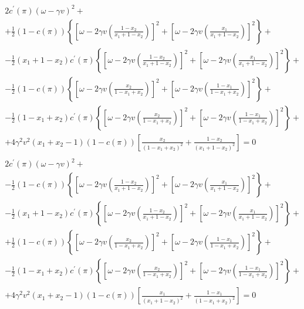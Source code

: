 \documentclass[12pt,a4paper]{article}
\begin{document}
\begin{eqnarray}
\label{focx1}
    \begin{split}
        2c^\prime(\pi)(\omega-\gamma v)^2+ \\
        +\frac{1}{2}(1-c(\pi))\left\{\left[\omega-2\gamma v\left(\frac{1-x_2}{x_1+1-x_2}\right)\right]^2+\left[\omega-2\gamma v\left(\frac{x_1}{x_1+1-x_2}\right)\right]^2\right\}+ \\
        -\frac{1}{2}(x_1 + 1-x_2)c^\prime(\pi)\left\{\left[\omega-2\gamma v\left(\frac{1-x_2}{x_1+1-x_2}\right)\right]^2+\left[\omega-2\gamma v\left(\frac{x_1}{x_1+1-x_2}\right)\right]^2\right\}+ \\
        -\frac{1}{2}(1-c(\pi))\left\{\left[\omega-2\gamma v\left(\frac{x_2}{1-x_1+x_2}\right)\right]^2+\left[\omega-2\gamma v\left(\frac{1-x_1}{1-x_1+x_2}\right)\right]^2\right\}+\\
        -\frac{1}{2}(1-x_1 + x_2)c^\prime(\pi)\left\{\left[\omega-2\gamma v\left(\frac{x_2}{1-x_1+x_2}\right)\right]^2+\left[\omega-2\gamma v\left(\frac{1-x_1}{1-x_1+x_2}\right)\right]^2\right\}+\\
        +4\gamma^2 v^2(x_1+x_2-1)(1-c(\pi))\left[\frac{x_2}{(1-x_1+x_2)^2}+\frac{1-x_2}{(x_1+1-x_2)^2}\right]=0
    \end{split} \\
    \label{focx2}
    \begin{split}
        2c^\prime(\pi)(\omega-\gamma v)^2+ \\
        -\frac{1}{2}(1-c(\pi))\left\{\left[\omega-2\gamma v\left(\frac{1-x_2}{x_1+1-x_2}\right)\right]^2+\left[\omega-2\gamma v\left(\frac{x_1}{x_1+1-x_2}\right)\right]^2\right\}+ \\
        -\frac{1}{2}(x_1 + 1-x_2)c^\prime(\pi)\left\{\left[\omega-2\gamma v\left(\frac{1-x_2}{x_1+1-x_2}\right)\right]^2+\left[\omega-2\gamma v\left(\frac{x_1}{x_1+1-x_2}\right)\right]^2\right\}+ \\
        +\frac{1}{2}(1-c(\pi))\left\{\left[\omega-2\gamma v\left(\frac{x_2}{1-x_1+x_2}\right)\right]^2+\left[\omega-2\gamma v\left(\frac{1-x_1}{1-x_1+x_2}\right)\right]^2\right\}+\\
        -\frac{1}{2}(1-x_1 + x_2)c^\prime(\pi)\left\{\left[\omega-2\gamma v\left(\frac{x_2}{1-x_1+x_2}\right)\right]^2+\left[\omega-2\gamma v\left(\frac{1-x_1}{1-x_1+x_2}\right)\right]^2\right\}+\\
        +4\gamma^2 v^2(x_1+x_2-1)(1-c(\pi))\left[\frac{x_1}{(x_1+1-x_2)^2}+\frac{1-x_1}{(1-x_1+x_2)^2}\right]=0
    \end{split}
\end{eqnarray}
\end{document}
